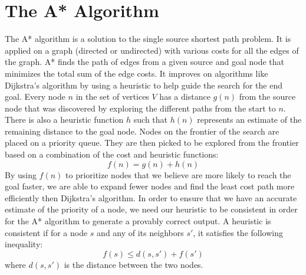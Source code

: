 
\section{The A* Algorithm}

The A* algorithm is a solution to the single source shortest path problem. It is applied on a graph (directed or undirected) with various costs for all the edges of the graph. A* finds the path of edges from a given source and goal node that minimizes the total sum of the edge costs.
\newline\newline
It improves on algorithms like Dijkstra's algorithm by using a heuristic to help guide the search for the end goal. Every node $n$ in the set of vertices $V$ has a distance $g(n)$ from the source node that was discovered by exploring the different paths from the start to $n$. There is also a heuristic function $h$ such that $h(n)$ represents an estimate of the remaining distance to the goal node. Nodes on the frontier of the search are placed on a priority queue. They are then picked to be explored from the frontier based on a combination of the cost and heuristic functions: 
$$f(n) = g(n) + h(n)$$
By using $f(n)$ to prioritize nodes that we believe are more likely to reach the goal faster, we are able to expand fewer nodes and find the least cost path more efficiently then Dijkstra's algorithm.
\newline\newline
In order to ensure that we have an accurate estimate of the priority of a node, we need our heuristic to be consistent in order for the A* algorithm to generate a provably correct output. A heuristic is consistent if for a node $s$ and any of its neighbors $s'$, it satisfies the following inequality:
$$f(s) \le d(s, s') + f(s')$$
where $d(s, s')$ is the distance between the two nodes.

